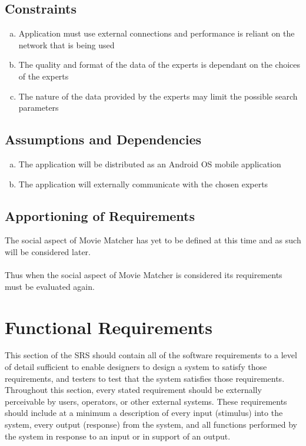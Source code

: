 \documentclass[]{article}
\begin{document}
\subsection{Constraints}
\label{sub:constraints}
\begin{enumerate}[a)]
	\item Application must use external connections and performance is reliant on the network that is being used
	\item The quality and format of the data of the experts is dependant on the choices of the experts
	\item The nature of the data provided by the experts may limit the possible search parameters
\end{enumerate}

\subsection{Assumptions and Dependencies}
\label{sub:assumptions_and_dependencies}
\begin{enumerate}[a)]
	\item The application will be distributed as an Android OS mobile application
	\item The application will externally communicate with the chosen experts
\end{enumerate}

\subsection{Apportioning of Requirements}
\label{sub:apportioning_of_requirements}
The social aspect of Movie Matcher has yet to be defined at this time and as such will be considered later.\\
\\
Thus when the social aspect of Movie Matcher is considered its requirements must be evaluated again.


\section{Functional Requirements} \label{freq}
\label{sec:functional_requirements}
This section of the SRS should contain all of the software requirements to a level of detail sufficient to enable designers to design a system to satisfy those requirements, and testers to test that the system satisfies those requirements. Throughout this section, every stated requirement should be externally perceivable by users, operators, or other external systems. These requirements should include at a minimum a description of every input (stimulus) into the system, every output (response) from the system, and all functions performed by the system in response to an input or in support of an output.
\end{document}
